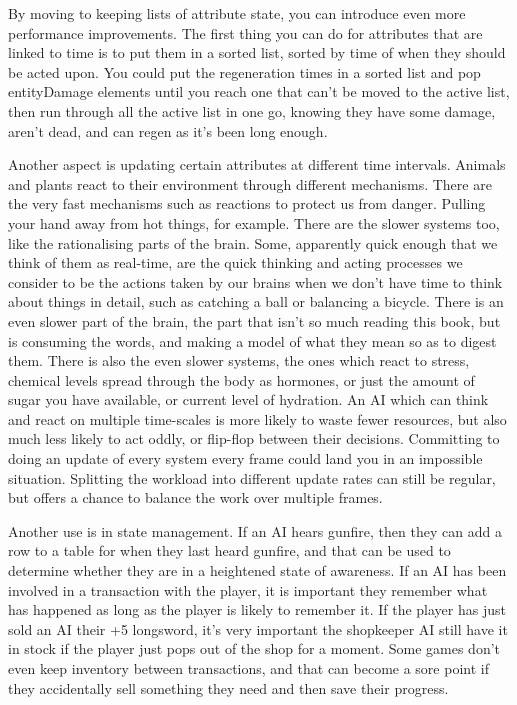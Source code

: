 \documentclass[a4paper,12pt]{book}
\begin{document}
By moving to keeping lists of attribute state, you can introduce even more performance improvements.
The first thing you can do for attributes that are linked to time is to put them in a sorted list, sorted by time of when they should be acted upon.
You could put the regeneration times in a sorted list and pop entityDamage elements until you reach one that can't be moved to the active list, then run through all the active list in one go, knowing they have some damage, aren't dead, and can regen as it's been long enough.

Another aspect is updating certain attributes at different time intervals.
Animals and plants react to their environment through different mechanisms.
There are the very fast mechanisms such as reactions to protect us from danger.
Pulling your hand away from hot things, for example.
There are the slower systems too, like the rationalising parts of the brain.
Some, apparently quick enough that we think of them as real-time, are the quick thinking and acting processes we consider to be the actions taken by our brains when we don't have time to think about things in detail, such as catching a ball or balancing a bicycle.
There is an even slower part of the brain, the part that isn't so much reading this book, but is consuming the words, and making a model of what they mean so as to digest them.
There is also the even slower systems, the ones which react to stress, chemical levels spread through the body as hormones, or just the amount of sugar you have available, or current level of hydration.
An AI which can think and react on multiple time-scales is more likely to waste fewer resources, but also much less likely to act oddly, or flip-flop between their decisions.
Committing to doing an update of every system every frame could land you in an impossible situation.
Splitting the workload into different update rates can still be regular, but offers a chance to balance the work over multiple frames.

Another use is in state management.
If an AI hears gunfire, then they can add a row to a table for when they last heard gunfire, and that can be used to determine whether they are in a heightened state of awareness.
If an AI has been involved in a transaction with the player, it is important they remember what has happened as long as the player is likely to remember it.
If the player has just sold an AI their +5 longsword, it's very important the shopkeeper AI still have it in stock if the player just pops out of the shop for a moment.
Some games don't even keep inventory between transactions, and that can become a sore point if they accidentally sell something they need and then save their progress.
\end{document}
